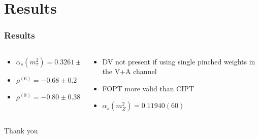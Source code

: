 \documentclass{beamer}
\begin{document}
\section{Results}
\begin{frame}
  \frametitle{Results}
  \begin{columns}{\textwidth}
    \begin{column}{.5\textwidth}
      \begin{itemize}
      \item \(\alpha_s(m_\tau^2) = 0.3261 \pm 0.0050\)
      \item \(\rho^{(6)} = -0.68 \pm 0.2\)
      \item \(\rho^{(8)} = -0.80 \pm 0.38\)
      \end{itemize}
    \end{column} \pause
    \begin{column}{.5\textwidth}
      \begin{itemize}
      \item DV not present if using single pinched weights in the V+A channel
      \item FOPT more valid than CIPT
      \item \(\alpha_s(m_Z^2) = 0.11940(60)\)
      \end{itemize}
    \end{column}
  \end{columns}
\end{frame}


\begin{frame}
  \centering
  \LARGE
  Thank you
\end{frame}


\begin{frame}
  \printbibliography
\end{frame}
\end{document}
